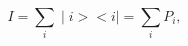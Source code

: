 \begin{equation}         
         I=\sum_{i}^{} \mid i><i \mid =\sum_{i}^{}P_i,                            
\end{equation}

